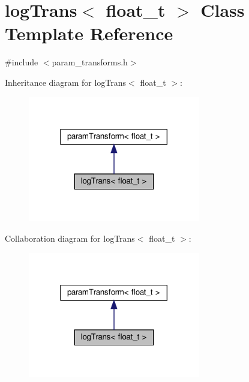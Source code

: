 \hypertarget{classlogTrans}{}\section{log\+Trans$<$ float\+\_\+t $>$ Class Template Reference}
\label{classlogTrans}


{\ttfamily \#include $<$param\+\_\+transforms.\+h$>$}



Inheritance diagram for log\+Trans$<$ float\+\_\+t $>$\+:
\nopagebreak
\begin{figure}[H]
\begin{center}
\leavevmode
\includegraphics[width=213pt]{classlogTrans__inherit__graph}
\end{center}
\end{figure}


Collaboration diagram for log\+Trans$<$ float\+\_\+t $>$\+:
\nopagebreak
\begin{figure}[H]
\begin{center}
\leavevmode
\includegraphics[width=213pt]{classlogTrans__coll__graph}
\end{center}
\end{figure}
